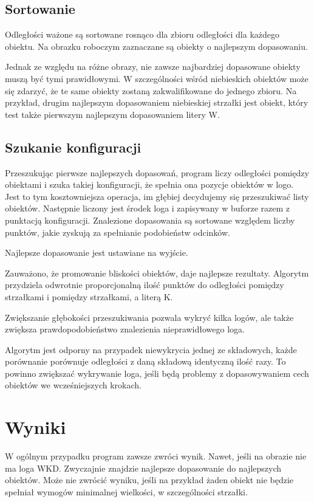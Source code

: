\documentclass[a4paper,12pt]{article}
\begin{document}
			\begin{center}
				\invarianttable{}
			\end{center}

		\subsection{Sortowanie}
			Odległości ważone są sortowane rosnąco dla zbioru odległości dla każdego obiektu.
			Na obrazku roboczym zaznaczane są obiekty o najlepszym dopasowaniu.
			
			Jednak ze względu na różne obrazy, nie zawsze najbardziej dopasowane obiekty muszą być tymi prawidłowymi.
			W szczególności wśród niebieskich obiektów może się zdarzyć, że te same obiekty zostaną zakwalifikowane do jednego zbioru.
			Na przykład, drugim najlepszym dopasowaniem niebieskiej strzałki jest obiekt, który test także pierwszym najlepszym dopasowaniem litery W.
			
		\subsection{Szukanie konfiguracji}
			Przeszukując pierwsze \bestobjectscomparisondepth{} najlepszych dopasowań, program liczy odległości pomiędzy obiektami i szuka takiej konfiguracji, że spełnia ona pozycje obiektów w logo.
			Jest to tym kosztowniejsza operacja, im głębiej decydujemy się przeszukiwać listy obiektów.
			Następnie liczony jest środek loga i zapisywany w buforze razem z punktacją konfiguracji.
			Znalezione dopasowania są sortowane względem liczby punktów, jakie zyskują za spełnianie podobieństw odcinków.
			
			Najlepsze dopasowanie jest ustawiane na wyjście.
			
			Zauważono, że promowanie bliskości obiektów, daje najlepsze rezultaty. Algorytm przydziela odwrotnie proporcjonalną ilość punktów do odległości pomiędzy strzałkami i pomiędzy strzałkami, a literą K.
			
			Zwiększanie głębokości przeszukiwania pozwala wykryć kilka logów, ale także zwiększa prawdopodobieństwo znalezienia nieprawidłowego loga.
			
			Algorytm jest odporny na przypadek niewykrycia jednej ze składowych, każde porównanie porównuje odległości z daną składową identyczną ilość razy.
			To powinno zwiększać wykrywanie loga, jeśli będą problemy z dopasowywaniem cech obiektów we wcześniejszych krokach.
			
	\section{Wyniki}
		W ogólnym przypadku program zawsze zwróci wynik. Nawet, jeśli na obrazie nie ma loga WKD. 
		Zwyczajnie znajdzie najlepsze dopasowanie do najlepszych obiektów.
		Może nie zwrócić wyniku, jeśli na przykład żaden obiekt nie będzie spełniał wymogów minimalnej wielkości, w szczególności strzałki.
\end{document}
